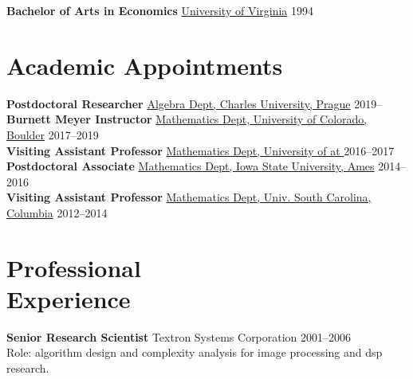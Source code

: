 \documentclass[margin,line]{resume}
\begin{document}
\begin{resume}
    \vspace{-1mm}
    \textbf{Bachelor of Arts in Economics} \hfill \href{https://www.virginia.edu/}{University of Virginia} 1994

    \section{\mysidestyle Academic Appointments}
    \textbf{Postdoctoral Researcher} \hfill \href{https://ka.karlin.mff.cuni.cz/}{Algebra Dept, Charles University, Prague} 2019--\phantom{2019} \\[5pt]
    \textbf{Burnett Meyer Instructor} \hfill \href{https://www.colorado.edu/math/}{Mathematics Dept, University of Colorado, Boulder} 2017--2019 \\[5pt]
    \textbf{Visiting Assistant Professor} \hfill \href{https://math.hawaii.edu/wordpress/}{Mathematics Dept, University of \Hawaii at \Manoa} 2016--2017 \\[5pt]
    \textbf{Postdoctoral Associate} \hfill \href{https://math.iastate.edu/}{Mathematics Dept, Iowa State University, Ames}  2014--2016 \\[5pt]
    \textbf{Visiting Assistant Professor} \hfill \href{https://sc.edu/study/colleges_schools/artsandsciences/mathematics/index.php}{Mathematics Dept, Univ. South Carolina, Columbia} 2012--2014



    \section{\mysidestyle Professional\\Experience}
    
    \textbf{Senior Research Scientist} \hfill Textron Systems Corporation 2001--2006\\
    {\small Role: algorithm design and complexity analysis for image processing and dsp research.}


\end{resume}
\end{document}
